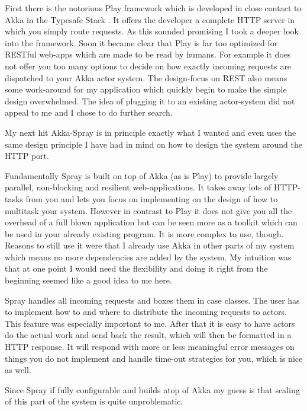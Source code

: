 \documentclass[11p]{scrartcl}
\begin{document}
First there is the notorious Play framework which is developed in close contact to Akka in the Typesafe Stack \cite{link:play}. 
It offers the developer a complete HTTP server in which you simply route requests. As this sounded promising I took a deeper look into the framework. Soon it became clear that Play is far too optimized for RESTful web-apps which are made to be read by humans. For example it does not offer you too many options to decide on how exactly incoming requests are dispatched to your Akka actor system. The design-focus on REST also means some work-around for my application which quickly begin to make the simple design overwhelmed. The idea of plugging it to an existing actor-system did not appeal to me and I chose to do further search.

My next hit Akka-Spray is in principle exactly what I wanted and even uses the same design principle I have had in mind on how to design the system around the HTTP port.

Fundamentally Spray is built on top of Akka (as is Play) to provide largely parallel, non-blocking and resilient web-applications. It takes away lots of HTTP-tasks from you and lets you focus on implementing on the design of how to multitask your system. However in contrast to Play it does not give you all the overhead of a full blown application but can be seen more as a toolkit which can be used in your already existing program.
It is more complex to use, though. Reasons to still use it were that I already use Akka in other parts of my system which means no more dependencies are added by the system. My intuition was that at one point I would need the flexibility and doing it right from the beginning seemed like a good idea to me here.

Spray handles all incoming requests and boxes them in case classes. The user has to implement how to and where to distribute the incoming requests to actors. This feature was especially important to me. After that it is easy to have actors do the actual work and send back the result, which will then be formatted in a HTTP response.  It will respond with more or less meaningful error messages on things you do not implement and handle time-out strategies for you, which is nice as well.

Since Spray if fully configurable and builds atop of Akka my guess is that scaling of this part of the system is quite unproblematic. 
\end{document}
